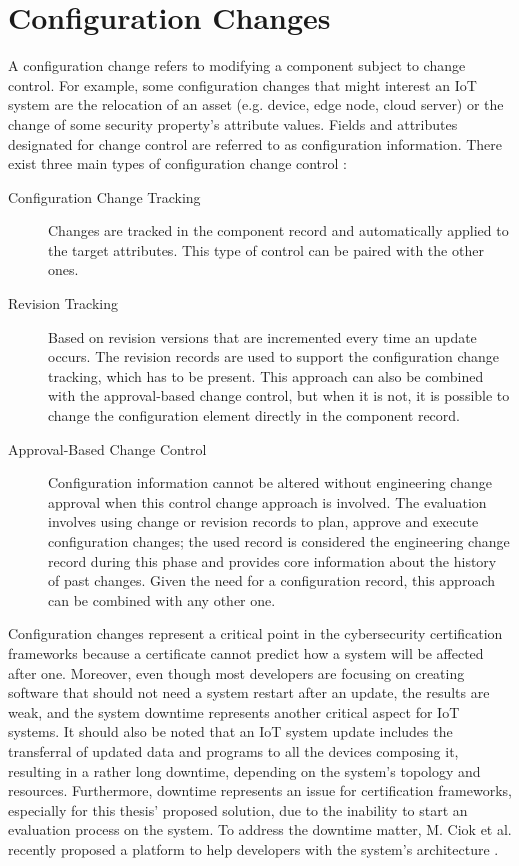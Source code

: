





\section{Configuration Changes}
A configuration change refers to modifying a component subject to change control. For example, some configuration changes that might interest an IoT system are the relocation of an asset (e.g. device, edge node, cloud server) or the change of some security property's attribute values.
Fields and attributes designated for change control are referred to as configuration information. There exist three main types of configuration change control \cite{IBMConfChange}:
\begin{description}
    \item[Configuration Change Tracking] Changes are tracked in the component record and automatically applied to the target attributes. This type of control can be paired with the other ones.
    \item[Revision Tracking] Based on revision versions that are incremented every time an update occurs. The revision records are used to support the configuration change tracking, which has to be present. This approach can also be combined with the approval-based change control, but when it is not, it is possible to change the configuration element directly in the component record.
    \item[Approval-Based Change Control] Configuration information cannot be altered without engineering change approval when this control change approach is involved. The evaluation involves using change or revision records to plan, approve and execute configuration changes; the used record is considered the engineering change record during this phase and provides core information about the history of past changes. Given the need for a configuration record, this approach can be combined with any other one.
\end{description}

Configuration changes represent a critical point in the cybersecurity certification frameworks because a certificate cannot predict how a system will be affected after one. Moreover, even though most developers are focusing on creating software that should not need a system restart after an update, the results are weak, and the system downtime represents another critical aspect for IoT systems. It should also be noted that an IoT system update includes the transferral of updated data and programs to all the devices composing it, resulting in a rather long downtime, depending on the system's topology and resources. Furthermore, downtime represents an issue for certification frameworks, especially for this thesis' proposed solution, due to the inability to start an evaluation process on the system.
To address the downtime matter, M. Ciok et al. recently proposed a platform to help developers with the system's architecture \cite{mateusz2022flex}.




